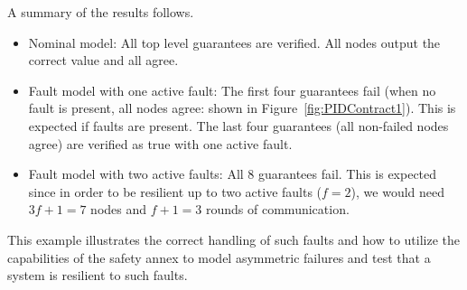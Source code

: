 A summary of the results follows. 
\begin{itemize}
	\item Nominal model: All top level guarantees are verified. All nodes output the correct value and all agree. 
	\item Fault model with one active fault: The first four guarantees fail (when no fault is present, all nodes agree: shown in Figure~\ref{fig:PIDContract1}). This is expected if faults are present. The last four guarantees (all non-failed nodes agree) are verified as true with one active fault. 
	\item Fault model with two active faults: All 8 guarantees fail. This is expected since in order to be resilient up to two active faults ($f=2$), we would need $3f + 1 = 7$ nodes and $f+1 = 3$ rounds of communication. 
\end{itemize}

This example illustrates the correct handling of such faults and how to utilize the capabilities of the safety annex to model asymmetric failures and test that a system is resilient to such faults. 
